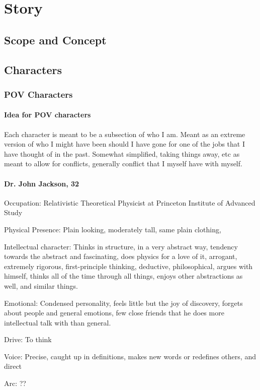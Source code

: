 \chapter{Story}

\section{Scope and Concept}

\section{Characters}
\subsection{POV Characters}
\subsubsection{Idea for POV characters}
Each character is meant to be a subsection of who I am. Meant as an extreme version of who I might have been should I have gone for one of the jobs that I have thought of in the past. Somewhat simplified, taking things away, etc as meant to allow for conflicts, generally conflict that I myself have with myself.
\subsubsection{Dr. John Jackson, 32}
Occupation: Relativistic Theoretical Physicist at Princeton Institute of Advanced Study

Physical Presence: Plain looking, moderately tall, same plain clothing,

Intellectual character: Thinks in structure, in a very abstract way, tendency towards the abstract and fascinating, does physics for a love of it, arrogant, extremely rigorous, first-principle thinking, deductive, philosophical, argues with himself, thinks all of the time through all things, enjoys other abstractions as well, and similar things.

Emotional: Condensed personality, feels little but the joy of discovery, forgets about people and general emotions, few close friends that he does more intellectual talk with than general.

Drive: To think

Voice: Precise, caught up in definitions, makes new words or redefines others, and direct

Arc: ??

